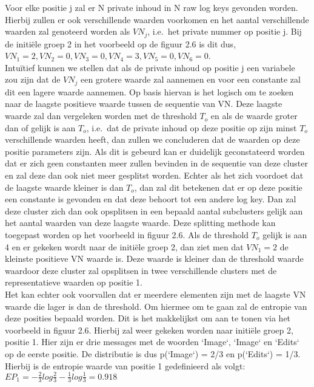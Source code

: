 \begin{itemize}
    Voor elke positie j zal er N private inhoud in N raw log keys gevonden worden. Hierbij zullen er ook verschillende waarden voorkomen en het aantal verschillende waarden zal genoteerd worden als \(VN_{j}\), i.e.\ het private nummer op positie j.
    Bij de initiële groep 2 in het voorbeeld op de figuur 2.6 is dit dus, \(VN_{1} = 2, VN_{2} = 0, VN_{3} = 0, VN_{4} = 3, VN_{5} = 0, VN_{6} = 0\).\\
    Intuïtief kunnen we stellen dat als de private inhoud op positie j een variabele zou zijn dat de \(VN_{j}\) een grotere waarde zal aannemen en voor een constante zal dit een lagere waarde aannemen. Op basis hiervan is het logisch om te zoeken naar de laagste positieve waarde tussen de sequentie van VN. Deze laagste waarde zal dan vergeleken worden met de threshold \(T_{o}\) en als de waarde groter dan of gelijk is aan \(T_{o}\), i.e.\ dat de private inhoud op deze positie op zijn minst \(T_{o}\) verschillende waarden heeft, dan zullen we concluderen dat de waarden op deze positie parameters zijn. Als dit is gebeurd kan er duidelijk geconstateerd worden dat er zich geen constanten meer zullen bevinden in de sequentie van deze cluster en zal deze dan ook niet meer gesplitst worden. Echter als het zich voordoet dat de laagste waarde kleiner is dan \(T_{o}\), dan zal dit betekenen dat er op deze positie een constante is gevonden en dat deze behoort tot een andere log key. Dan zal deze cluster zich dan ook opsplitsen in een bepaald aantal subclusters gelijk aan het aantal waarden van deze laagste waarde. Deze splitting methode kan toegepast worden op het voorbeeld in figuur 2.6. Als de threshold \(T_{o}\) gelijk is aan 4 en er gekeken wordt naar de initiële groep 2, dan ziet men dat \(VN_{1} = 2\) de kleinste positieve VN waarde is. Deze waarde is kleiner dan de threshold waarde waardoor deze cluster zal opsplitsen in twee verschillende clusters met de representatieve waarden op positie 1. \\
    Het kan echter ook voorvallen dat er meerdere elementen zijn met de laagste VN waarde die lager is dan de threshold. Om hiermee om te gaan zal de entropie van deze posities bepaald worden. Dit is het makkelijkst om aan te tonen via het voorbeeld in figuur 2.6. Hierbij zal weer gekeken worden naar initiële groep 2, positie 1. Hier zijn er drie messages met de woorden `Image`, `Image` en `Edits` op de eerste positie. De distributie is dus p(`Image`) = 2/3 en p(`Edits`) = 1/3. Hierbij is de entropie waarde van positie 1 gedefinieerd als volgt: \\
    \(EP_{1} = - \frac{2}{3}log\frac{2}{3} - \frac{1}{3}log\frac{1}{3} = 0.918\)\\

\end{itemize}
